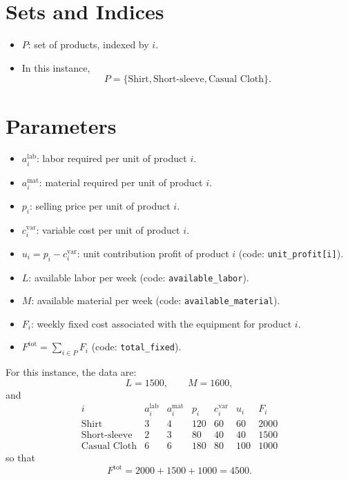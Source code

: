 \section*{Sets and Indices}

\begin{itemize}
    \item $P$: set of products, indexed by $i$.
    \item In this instance,
    \[
    P=\{\text{Shirt},\text{Short-sleeve},\text{Casual Cloth}\}.
    \]
\end{itemize}

\section*{Parameters}

\begin{itemize}
    \item $a_i^{\text{lab}}$: labor required per unit of product $i$.
    \item $a_i^{\text{mat}}$: material required per unit of product $i$.
    \item $p_i$: selling price per unit of product $i$.
    \item $c_i^{\text{var}}$: variable cost per unit of product $i$.
    \item $u_i = p_i - c_i^{\text{var}}$: unit contribution profit of product $i$ (code: \texttt{unit\_profit[i]}).
    \item $L$: available labor per week (code: \texttt{available\_labor}).
    \item $M$: available material per week (code: \texttt{available\_material}).
    \item $F_i$: weekly fixed cost associated with the equipment for product $i$.
    \item $F^{\text{tot}}=\sum_{i\in P} F_i$ (code: \texttt{total\_fixed}).
\end{itemize}

For this instance, the data are:
\[
L=1500,\qquad M=1600,
\]
and
\[
\begin{array}{c|cccccc}
i & a_i^{\text{lab}} & a_i^{\text{mat}} & p_i & c_i^{\text{var}} & u_i & F_i\\
\hline
\text{Shirt} & 3 & 4 & 120 & 60 & 60 & 2000\\
\text{Short-sleeve} & 2 & 3 & 80 & 40 & 40 & 1500\\
\text{Casual Cloth} & 6 & 6 & 180 & 80 & 100 & 1000
\end{array}
\]
so that
\[
F^{\text{tot}}=2000+1500+1000=4500.
\]

